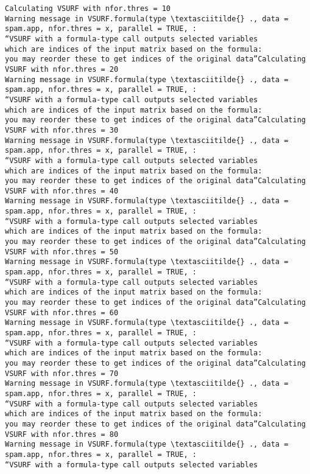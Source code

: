 \documentclass[11pt]{article}
\begin{document}
    \begin{Verbatim}[commandchars=\\\{\}]
Calculating VSURF with nfor.thres = 10
Warning message in VSURF.formula(type \textasciitilde{} ., data = spam.app, nfor.thres = x, parallel = TRUE, :
“VSURF with a formula-type call outputs selected variables
which are indices of the input matrix based on the formula:
you may reorder these to get indices of the original data”Calculating VSURF with nfor.thres = 20
Warning message in VSURF.formula(type \textasciitilde{} ., data = spam.app, nfor.thres = x, parallel = TRUE, :
“VSURF with a formula-type call outputs selected variables
which are indices of the input matrix based on the formula:
you may reorder these to get indices of the original data”Calculating VSURF with nfor.thres = 30
Warning message in VSURF.formula(type \textasciitilde{} ., data = spam.app, nfor.thres = x, parallel = TRUE, :
“VSURF with a formula-type call outputs selected variables
which are indices of the input matrix based on the formula:
you may reorder these to get indices of the original data”Calculating VSURF with nfor.thres = 40
Warning message in VSURF.formula(type \textasciitilde{} ., data = spam.app, nfor.thres = x, parallel = TRUE, :
“VSURF with a formula-type call outputs selected variables
which are indices of the input matrix based on the formula:
you may reorder these to get indices of the original data”Calculating VSURF with nfor.thres = 50
Warning message in VSURF.formula(type \textasciitilde{} ., data = spam.app, nfor.thres = x, parallel = TRUE, :
“VSURF with a formula-type call outputs selected variables
which are indices of the input matrix based on the formula:
you may reorder these to get indices of the original data”Calculating VSURF with nfor.thres = 60
Warning message in VSURF.formula(type \textasciitilde{} ., data = spam.app, nfor.thres = x, parallel = TRUE, :
“VSURF with a formula-type call outputs selected variables
which are indices of the input matrix based on the formula:
you may reorder these to get indices of the original data”Calculating VSURF with nfor.thres = 70
Warning message in VSURF.formula(type \textasciitilde{} ., data = spam.app, nfor.thres = x, parallel = TRUE, :
“VSURF with a formula-type call outputs selected variables
which are indices of the input matrix based on the formula:
you may reorder these to get indices of the original data”Calculating VSURF with nfor.thres = 80
Warning message in VSURF.formula(type \textasciitilde{} ., data = spam.app, nfor.thres = x, parallel = TRUE, :
“VSURF with a formula-type call outputs selected variables

\end{Verbatim}
\end{document}
